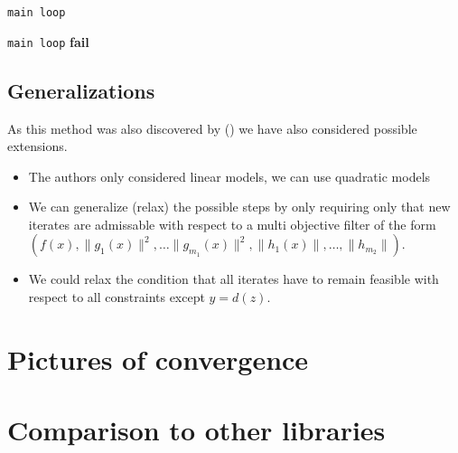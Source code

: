 \documentclass{article}
\begin{document}
\begin{algorithm}
\begin{algorithmic}[1]
				\State \Goto \texttt{main loop}
				\Else
				\EndIf

			\EndIf
		\Else
			\State \Goto \texttt{main loop}
		\EndIf
	\Else
			\textbf{fail}
		\EndIf
	\EndIf
\EndWhile
\EndProcedure
\end{algorithmic}
\end{algorithm}

\FloatBarrier

\subsection{Generalizations}

As this method was also discovered by () we have also considered possible extensions.

\begin{itemize}
\item The authors only considered linear models, we can use quadratic models
\item We can generalize (relax) the possible steps by only requiring only that new iterates are admissable with respect to a multi objective filter of the form $(f(x), \|g_1(x)\|^2, \ldots \|g_{m_1}(x)\|^2, \|h_1(x)\|, \ldots, \|h_{m_2}\|)$.
\item We could relax the condition that all iterates have to remain feasible with respect to all constraints except $y = d(z)$.
\end{itemize}

\section{Pictures of convergence}
\section{Comparison to other libraries}




\newpage



\end{document}

